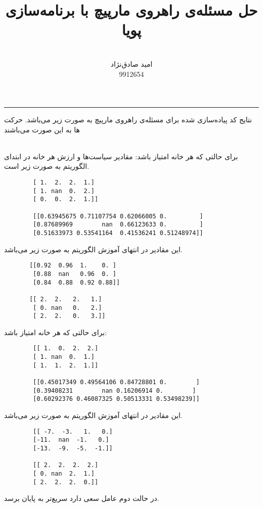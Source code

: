 \documentclass{article}
\title{
حل مسئله‌ی راهروی مارپیچ با برنامه‌سازی پویا
}
\author{\\امید صادق‌نژاد\\

9912654}
\date{}
\begin{document}
	
	\maketitle
	\hrule
	\bigskip
	
	نتایج کد پیاده‌سازی شده برای مسئله‌ی راهروی مارپیچ به صورت زیر می‌باشد. حرکت ها به این صورت می‌باشند
	\\
	\\
	
	\bigskip
	
	برای حالتی که هر خانه امتیاز 
	باشد:
	مقادیر سیاست‌ها و ارزش هر خانه در ابتدای الگوریتم به صورت زیر است.
	\begin{latin}
		\begin{lstlisting}
		[ 1.  2.  2.  1.]
		[ 1. nan  0.  2.]
		[ 0.  0.  2.  1.]]
		
		[[0.63945675 0.71107754 0.62066005 0.         ]
		[0.87689969        nan  0.66123633 0.         ]
		[0.51633973 0.53541164  0.41536241 0.51248974]]
		\end{lstlisting}
	\end{latin}

این مقادیر در انتهای آموزش الگوریتم به صورت زیر می‌باشد.
	\begin{latin}
	\begin{lstlisting}
	   [[0.92  0.96  1.    0. ]
		[0.88  nan   0.96  0. ]
		[0.84  0.88  0.92 0.88]]
	
       [[ 2.  2.   2.   1.]
		[ 0. nan   0.   2.]
		[ 2.  2.   0.   3.]]
	\end{lstlisting}
\end{latin}
	
	
	برای حالتی که هر خانه امتیاز 
	باشد:
	
		\begin{latin}
		\begin{lstlisting}
		[[ 1.  0.  2.  2.]
		[ 1. nan  0.  1.]
		[ 1.  1.  2.  1.]]
		
		[[0.45017349 0.49564106 0.84728801 0.        ]
		[0.39408231        nan 0.16206914 0.        ]
		[0.60292376 0.46087325 0.50513331 0.53498239]]
		\end{lstlisting}
	\end{latin}
	
	این مقادیر در انتهای آموزش الگوریتم به صورت زیر می‌باشد.
	\begin{latin}
		\begin{lstlisting}
		[[ -7.  -3.   1.   0.]
		[-11.  nan  -1.   0.]
		[-13.  -9.  -5.  -1.]]
		
		[[ 2.  2.  2.  2.]
		[ 0. nan  2.  1.]
		[ 2.  2.  2.  0.]]
		\end{lstlisting}
	\end{latin}
در حالت دوم عامل سعی دارد سریع‌تر به پایان برسد.
	
\end{document}
